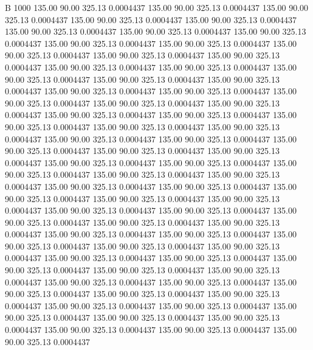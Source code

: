 


B 1000
 135.00   90.00  325.13   0.0004437
 135.00   90.00  325.13   0.0004437
 135.00   90.00  325.13   0.0004437
 135.00   90.00  325.13   0.0004437
 135.00   90.00  325.13   0.0004437
 135.00   90.00  325.13   0.0004437
 135.00   90.00  325.13   0.0004437
 135.00   90.00  325.13   0.0004437
 135.00   90.00  325.13   0.0004437
 135.00   90.00  325.13   0.0004437
 135.00   90.00  325.13   0.0004437
 135.00   90.00  325.13   0.0004437
 135.00   90.00  325.13   0.0004437
 135.00   90.00  325.13   0.0004437
 135.00   90.00  325.13   0.0004437
 135.00   90.00  325.13   0.0004437
 135.00   90.00  325.13   0.0004437
 135.00   90.00  325.13   0.0004437
 135.00   90.00  325.13   0.0004437
 135.00   90.00  325.13   0.0004437
 135.00   90.00  325.13   0.0004437
 135.00   90.00  325.13   0.0004437
 135.00   90.00  325.13   0.0004437
 135.00   90.00  325.13   0.0004437
 135.00   90.00  325.13   0.0004437
 135.00   90.00  325.13   0.0004437
 135.00   90.00  325.13   0.0004437
 135.00   90.00  325.13   0.0004437
 135.00   90.00  325.13   0.0004437
 135.00   90.00  325.13   0.0004437
 135.00   90.00  325.13   0.0004437
 135.00   90.00  325.13   0.0004437
 135.00   90.00  325.13   0.0004437
 135.00   90.00  325.13   0.0004437
 135.00   90.00  325.13   0.0004437
 135.00   90.00  325.13   0.0004437
 135.00   90.00  325.13   0.0004437
 135.00   90.00  325.13   0.0004437
 135.00   90.00  325.13   0.0004437
 135.00   90.00  325.13   0.0004437
 135.00   90.00  325.13   0.0004437
 135.00   90.00  325.13   0.0004437
 135.00   90.00  325.13   0.0004437
 135.00   90.00  325.13   0.0004437
 135.00   90.00  325.13   0.0004437
 135.00   90.00  325.13   0.0004437
 135.00   90.00  325.13   0.0004437
 135.00   90.00  325.13   0.0004437
 135.00   90.00  325.13   0.0004437
 135.00   90.00  325.13   0.0004437
 135.00   90.00  325.13   0.0004437
 135.00   90.00  325.13   0.0004437
 135.00   90.00  325.13   0.0004437
 135.00   90.00  325.13   0.0004437
 135.00   90.00  325.13   0.0004437
 135.00   90.00  325.13   0.0004437
 135.00   90.00  325.13   0.0004437
 135.00   90.00  325.13   0.0004437
 135.00   90.00  325.13   0.0004437
 135.00   90.00  325.13   0.0004437
 135.00   90.00  325.13   0.0004437
 135.00   90.00  325.13   0.0004437
 135.00   90.00  325.13   0.0004437
 135.00   90.00  325.13   0.0004437
 135.00   90.00  325.13   0.0004437
 135.00   90.00  325.13   0.0004437
 135.00   90.00  325.13   0.0004437
 135.00   90.00  325.13   0.0004437
 135.00   90.00  325.13   0.0004437
 135.00   90.00  325.13   0.0004437
 135.00   90.00  325.13   0.0004437
